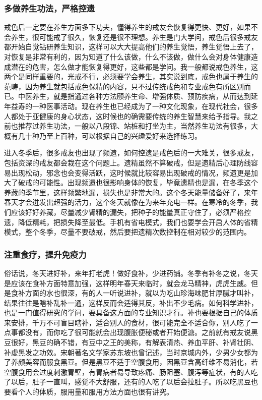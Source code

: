 \subsubsection{多做养生功法，严格控遗}

戒色后一定要在养生方面多下功夫，懂得养生的戒友会恢复得更快、更好，如果不会养生，很可能戒了很久，恢复还是很不理想。养生是门大学问，戒色后很多戒友都开始自觉钻研养生知识，这样可以大大提高他们的养生觉悟，养生觉悟上去了，对恢复是非常有利的，因为知道了什么该做，什么不该做，做什么会对身体健康造成潜在的危害，怎么做才能恢复得更好，这些都是学问。我一般都说戒色养生，这两个是同样重要的，光戒不行，必须要学会养生，其实说到底，戒色也属于养生的范畴，因为养生就包括戒色保精的内容，只不过传统戒色和专业戒色有所区别而已。中医养生，就是指通过各种方法颐养生命、增强体质、预防疾病，从而达到延年益寿的一种医事活动。现在养生也已经成为了一种文化现象，在现代社会，很多人都处于亚健康的身心状态，这时候也的确需要传统的养生智慧来给予指导。我之前也推荐过养生功法，一般以八段锦、站桩和打坐为主，当然养生功法有很多，大概有几十种乃至上百种，可以根据自己的兴趣爱好来选择练习。

进入冬季后，很多戒友也出现了频遗，如何控遗是戒色后的一大难关，很多戒友，包括资深的戒友都会栽在这个问题上。遗精虽然不算破戒，但是遗精后心理防线容易出现松动，邪念也会变得活跃，这时候就比较容易出现破戒的情况，频遗更是加大了破戒的可能性。出现频遗也很影响身体的恢复，毕竟遗精也是漏，在冬季这个养藏的季节里，这样频繁地漏，损失也是非常大的。这个冬天能量储备好了，来年春天才会迸发出超强的活力，这个冬天就像在为来年充电一样。在寒冷的冬季，我们应该好好养藏，尽量减少肾精的漏失，把种子的能量真正守住了，必须严格控遗，降低精耗，把损失降至最低。手机有省电模式，我们也要学会开启人体的省精模式，整个冬季，尽量不要破戒，然后要把遗精次数控制在相对较少的范围内。

\subsubsection{注重食疗，提升免疫力}

俗话说，冬天进好补，来年打老虎！做好食补，少进药铺。冬季有补冬之说，冬天是应该在食补方面特意加强，这样明年春天来临时，就会龙马精神，虎虎生威。但是食补方面的水也很深，有的人一听说进补，就以为吃山珍海味肥甘厚腻才叫补，结果往往是瞎补乱补一通，这样反而会适得其反，补出不少毛病。如何科学进补，也是一门值得研究的学问，要具备这方面的专业知识才行。补也要根据自己的体质来安排，千万不可盲目瞎补，适合别人的食材，很可能完全不适合你，别人吃了一点事都没有，而你吃了很可能就会出现腹胀便秘或者开始便溏。之前就有戒友说黑豆很好，黑豆的确不错，有豆中之王的美称，有解表清热、养血平肝、补肾壮阴、补虚黑发之功效。宋朝著名文学家苏东坡也曾记述，当时京城内外，少男少女都为了养颜美容而服食黑豆。但是黑豆不适于空腹食用，因黑豆含高纤维不易消化，若空腹食用会过度刺激胃壁，有胃病者易导致疼痛、肠阻塞、腹泻等症状，有的人吃了以后，肚子一直叫，感觉不大舒服，还有的人吃了以后会拉肚子。所以吃黑豆也要看个人的体质，服用量和服用方法方面也很有讲究。

